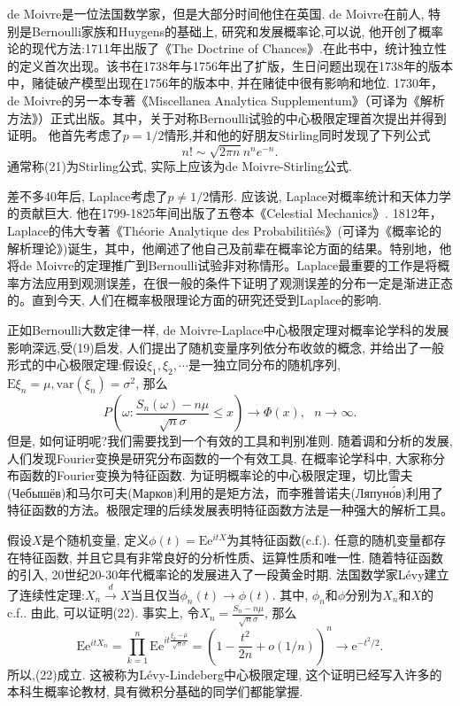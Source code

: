 de Moivre是一位法国数学家，但是大部分时间他住在英国. de Moivre在前人, 特别是Bernoulli家族和Huygens的基础上, 研究和发展概率论,可以说, 他开创了概率论的现代方法:1711年出版了《The Doctrine of Chances》.在此书中，统计独立性的定义首次出现。该书在1738年与1756年出了扩版，生日问题出现在1738年的版本中，赌徒破产模型出现在1756年的版本中, 并在赌徒中很有影响和地位.
1730年，de Moivre的另一本专著《Miscellanea Analytica Supplementum》（可译为《解析方法》）正式出版。其中，关于对称Bernoulli试验的中心极限定理首次提出并得到证明。
他首先考虑了$p=1/2$情形,并和他的好朋友Stirling同时发现了下列公式\begin{equation}
n!\sim \sqrt{2\pi n}n^ne^{-n}.
\end{equation}
通常称(21)为Stirling公式, 实际上应该为de Moivre-Stirling公式.

差不多40年后, Laplace考虑了$p\neq 1/2$情形. 应该说, Laplace对概率统计和天体力学的贡献巨大. 他在1799-1825年间出版了五卷本《Celestial Mechanics》.
1812年，Laplace的伟大专著《Théorie Analytique des Probabilitiìés》(可译为《概率论的解析理论》)诞生，其中，他阐述了他自己及前辈在概率论方面的结果。特别地，他将de Moivre的定理推广到Bernoulli试验非对称情形。Laplace最重要的工作是将概率方法应用到观测误差，在很一般的条件下证明了观测误差的分布一定是渐进正态的。直到今天, 人们在概率极限理论方面的研究还受到Laplace的影响.

正如Bernoulli大数定律一样, de Moivre-Laplace中心极限定理对概率论学科的发展影响深远,受(19)启发, 人们提出了随机变量序列依分布收敛的概念, 并给出了一般形式的中心极限定理:假设$\xi_1,\xi_2,\cdots$是一独立同分布的随机序列,$\mathrm{E}\xi_n = \mu,\mathrm{var}(\xi_n) = \sigma^2$, 那么
\begin{equation}
P\left( \omega:\frac{S_n(\omega)-n\mu}{\sqrt{n}\sigma}\leqslant x \right) \to \Phi(x),~~~n\to\infty.
\end{equation}
但是, 如何证明呢?我们需要找到一个有效的工具和判别准则. 随着调和分析的发展, 人们发现Fourier变换是研究分布函数的一个有效工具. 在概率论学科中, 大家称分布函数的Fourier变换为特征函数. 为证明概率论的中心极限定理，切比雪夫(Чебышёв)和马尔可夫(Марков)利用的是矩方法，而李雅普诺夫(Ляпуно́в)利用了特征函数的方法。极限定理的后续发展表明特征函数方法是一种强大的解析工具。

假设$X$是个随机变量, 定义$\phi(t) = \mathrm{E}\mathrm{e}^{itX}$为其特征函数(c.f.). 任意的随机变量都存在特征函数, 并且它具有非常良好的分析性质、运算性质和唯一性. 随着特征函数的引入, 20世纪20-30年代概率论的发展进入了一段黄金时期. 法国数学家Lévy建立了连续性定理:$X_n\stackrel{d}{\rightarrow}X$当且仅当$\phi_n(t)\to\phi(t)$. 其中, $\phi_n$和$\phi$分别为$X_n$和$X$的c.f.. 由此, 可以证明(22). 事实上, 令$X_n = \frac{S_n-n\mu}{\sqrt{n}\sigma}$, 那么
\begin{equation}
\mathrm{E}\mathrm{e}^{itX_n} =\prod_{k=1}^n\mathrm{E}\mathrm{e}^{it\frac{\xi_k-\mu}{\sqrt{n}\sigma}}
=\left( 1-\frac{t^2}{2n}+o(1/n) \right)^n
\to \mathrm{e}^{-t^2/2}.
\end{equation}
所以,(22)成立. 这被称为Lévy-Lindeberg中心极限定理, 这个证明已经写入许多的本科生概率论教材, 具有微积分基础的同学们都能掌握.

